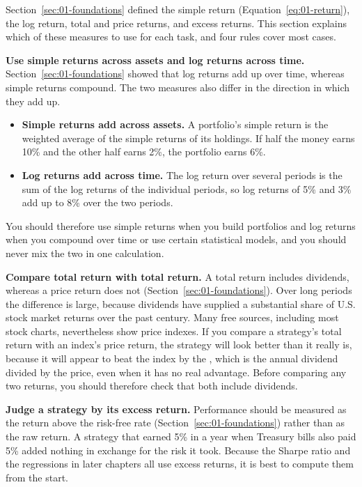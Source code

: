Section~\ref{sec:01-foundations} defined the simple return (Equation~\eqref{eq:01-return}), the log return, total and price returns, and excess returns. This section explains which of these measures to use for each task, and four rules cover most cases.

\textbf{Use simple returns across assets and log returns across time.} Section~\ref{sec:01-foundations} showed that log returns add up over time, whereas simple returns compound. The two measures also differ in the direction in which they add up.

\begin{itemize}
  \item \textbf{Simple returns add across assets.} A portfolio's simple return is the weighted average of the simple returns of its holdings. If half the money earns 10\% and the other half earns 2\%, the portfolio earns 6\%.
  \item \textbf{Log returns add across time.} The log return over several periods is the sum of the log returns of the individual periods, so log returns of 5\% and 3\% add up to 8\% over the two periods.
\end{itemize}

You should therefore use simple returns when you build portfolios and log returns when you compound over time or use certain statistical models, and you should never mix the two in one calculation.

\textbf{Compare total return with total return.} A total return includes dividends, whereas a price return does not (Section~\ref{sec:01-foundations}). Over long periods the difference is large, because dividends have supplied a substantial share of U.S. stock market returns over the past century. Many free sources, including most stock charts, nevertheless show price indexes. If you compare a strategy's total return with an index's price return, the strategy will look better than it really is, because it will appear to beat the index by the , which is the annual dividend divided by the price, even when it has no real advantage. Before comparing any two returns, you should therefore check that both include dividends.

\textbf{Judge a strategy by its excess return.} Performance should be measured as the return above the risk-free rate (Section~\ref{sec:01-foundations}) rather than as the raw return. A strategy that earned 5\% in a year when Treasury bills also paid 5\% added nothing in exchange for the risk it took. Because the Sharpe ratio and the regressions in later chapters all use excess returns, it is best to compute them from the start.

